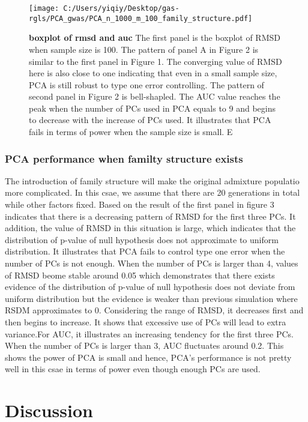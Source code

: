 \documentclass[12pt]{article}
\begin{document}
\begin{figure}[bp!]
  \centering
  \texttt{[image: C:/Users/yiqiy/Desktop/gas-rgls/PCA\_gwas/PCA\_n\_1000\_m\_100\_family\_structure.pdf]}
  \caption{
    {\bf boxplot of rmsd and auc}
    The first panel is the boxplot of RMSD when sample size is 100. The pattern of panel A in Figure 2 is similar to the first panel in Figure 1. The converging value of RMSD here is also close to one indicating that even in a small sample size, PCA is still robust to type one error controlling. The pattern of second panel in Figure 2 is bell-shapled. The AUC value reaches the peak when the number of PCs used in PCA equals to 9 and begins to decrease with the increase of PCs used. It illustrates that PCA fails in terms of power when the sample size is small. E}
  \label{fig:example}
\end{figure}

\subsubsection{PCA performance when familty structure exists}

The introduction of family structure will make the original admixture populatio more complicated. In this csae, we assume that there are 20 generations in total while other factors fixed. Based on the result of the first panel in figure 3 indicates that there is a decreasing pattern of RMSD for the first three PCs. It addition, the value of RMSD in this situation is large, which indicates that the distribution of p-value of null hypothesis does not approximate to uniform distribution. It illustrates that PCA fails to control type one error when the number of PCs is not enough. When the number of PCs is larger than 4, values of RMSD beome stable around 0.05 which demonstrates that there exists evidence of the distribution of p-value of null hypothesis does not deviate from uniform distribution but the evidence is weaker than previous simulation where RSDM approximates to 0. Considering the range of RMSD, it decreases first and then begins to increase. It shows that excessive use of PCs will lead to extra variance.For AUC, it illustrates an increasing tendency for the first three PCs. When the number of PCs is larger than 3, AUC fluctuates around 0.2. This shows the power of PCA is small and hence, PCA's performance is not pretty well in this csae in terms of power even though enough PCs are used. 


\section{Discussion}
\end{document}
